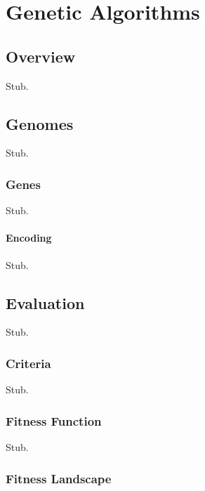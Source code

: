 \chapter{Genetic Algorithms}


\label{Chapter2}

\section{Overview}

Stub.

\section{Genomes}

Stub.

\subsection{Genes}

Stub.

\subsubsection{Encoding}

Stub.

\section{Evaluation}

Stub.

\subsection{Criteria}

Stub.

\subsection{Fitness Function}

Stub.

\subsection{Fitness Landscape}


